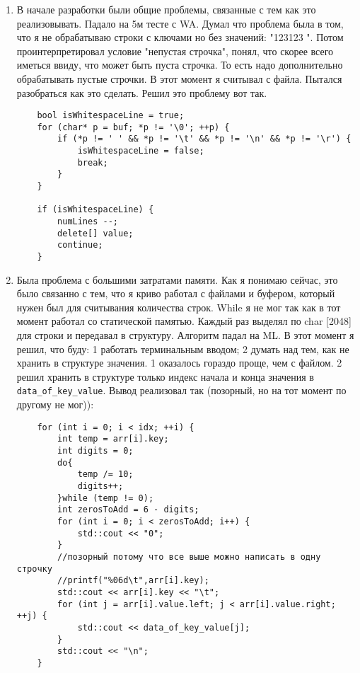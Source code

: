 \documentclass[12pt]{article}
\begin{document}
\begin{enumerate}
    \item В начале разработки были общие проблемы, связанные с тем как это реализовывать. Падало на 5м тесте с WA. Думал что проблема была в том, что я не обрабатываю строки с ключами но без значений: "123123 ". Потом проинтерпретировал условие "непустая строчка", понял, что скорее всего иметься ввиду, что может быть пуста строчка. То есть надо дополнительно обрабатывать пустые строчки. В этот момент я считывал с файла. Пытался разобраться как это сделать. Решил это проблему вот так.
    \begin{lstlisting}
    bool isWhitespaceLine = true;
    for (char* p = buf; *p != '\0'; ++p) {
        if (*p != ' ' && *p != '\t' && *p != '\n' && *p != '\r') {
            isWhitespaceLine = false;
            break;
        }
    }

    if (isWhitespaceLine) {
        numLines --;
        delete[] value;
        continue;
    }
\end{lstlisting}
    \item Была проблема с большими затратами памяти. Как я понимаю сейчас, это было связанно с тем, что я криво работал с файлами и буфером, который нужен был для считывания количества строк. While я не мог так как в тот момент работал со статической памятью. Каждый раз выделял по char [2048] для строки и передавал в структуру. Алгоритм падал на ML. В этот момент я решил, что буду: 1 работать терминальным вводом; 2 думать над тем, как не хранить в структуре значения. 1 оказалось гораздо проще, чем с файлом. 2 решил хранить в структуре только индекс начала и конца значения в \verb|data_of_key_value|. Вывод реализовал так (позорный, но на тот момент по другому не мог)):
\begin{lstlisting}
    for (int i = 0; i < idx; ++i) {
        int temp = arr[i].key;
        int digits = 0;
        do{
            temp /= 10;
            digits++;
        }while (temp != 0);
        int zerosToAdd = 6 - digits;
        for (int i = 0; i < zerosToAdd; i++) {
            std::cout << "0";
        }
        //позорный потому что все выше можно написать в одну строчку
        //printf("%06d\t",arr[i].key);
        std::cout << arr[i].key << "\t";
        for (int j = arr[i].value.left; j < arr[i].value.right; ++j) {
            std::cout << data_of_key_value[j];
        }
        std::cout << "\n";
    }
\end{lstlisting}


\end{enumerate}
\end{document}

